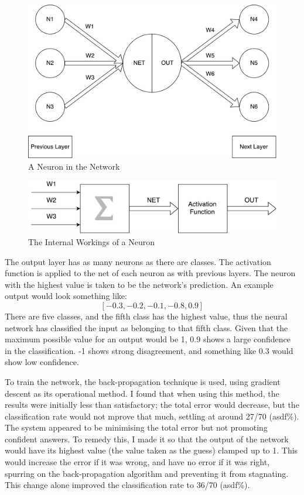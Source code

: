  \begin{figure}[!h]
 	
 	\centering
 	\includegraphics[width=\textwidth]{figures/multilayer_perceptron_neuron}
 	\centering
 	\caption{A Neuron in the Network}
 	\label{fig:multi_neuron}
 \end{figure}

\begin{figure}[!h]
	
	\centering
	\includegraphics[width=\textwidth]{figures/multilayer_perceptron_neuron2}
	\centering
	\caption{The Internal Workings of a Neuron}
	\label{fig:multi_neuron_close}
\end{figure}
 
 
 The output layer has as many neurons as there are classes. The activation function is applied to the net of each neuron as with previous layers. The neuron with the highest value is taken to be the network's prediction. An example output would look something like:
 \[ [-0.3, -0.2, -0.1, -0.8, 0.9] \] There are five classes, and the fifth class has the highest value, thus the neural network has classified the input as belonging to that fifth class. Given that the maximum possible value for an output would be 1, 0.9 shows a large confidence in the classification. -1 shows strong disagreement, and something like 0.3 would show low confidence.
 
 To train the network, the back-propagation technique is used, using gradient descent as its operational method. I found that when using this method, the results were initially less than satisfactory; the total error would decrease, but the classification rate would not mprove that much, settling at around 27/70 (asdf\%). The system appeared to be minimising the total error but not promoting confident answers. To remedy this, I made it so that the output of the network would have its highest value (the value taken as the guess) clamped up to 1. This would increase the error if it was wrong, and have no error if it was right, spurring on the back-propagation algorithm and preventing it from stagnating. This change alone improved the classification rate to 36/70 (asdf\%).
 
